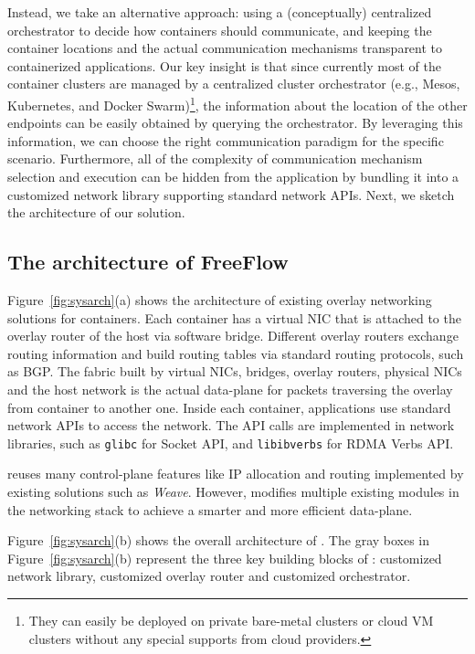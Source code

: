 Instead, we take an alternative approach: using a (conceptually) centralized
orchestrator to decide how containers should communicate, and keeping the
container locations and the actual communication mechanisms transparent to
containerized applications. Our key insight is that since currently most of the
container clusters are managed by a centralized cluster orchestrator (e.g., Mesos,
Kubernetes, and Docker Swarm)\footnote{They can easily be deployed on private
bare-metal clusters or cloud VM clusters without any special supports from cloud
providers.}, the information about the location of the other endpoints can be
easily obtained by querying the orchestrator. By leveraging this information, we
can choose the right communication paradigm for the specific scenario.
Furthermore, all of the complexity of communication mechanism selection and
execution can be hidden from the application by bundling it into a customized
network library supporting standard network APIs.  Next, we sketch the
architecture of our solution.

\subsection{The architecture of FreeFlow}

Figure~\ref{fig:sysarch}(a) shows the architecture of existing overlay
networking solutions for containers. Each container has a virtual NIC that is
attached to the overlay router of the host via software bridge. Different
overlay routers exchange routing information and build routing tables via
standard routing protocols, such as BGP. The fabric built by virtual NICs,
bridges, overlay routers, physical NICs and the host network is the
actual data-plane for packets traversing the overlay from container to another
one. Inside each container, applications use standard network APIs to access the
network. The API calls are implemented in network libraries, such as
\texttt{glibc} for Socket API, and \texttt{libibverbs} for RDMA Verbs API.

\sysname reuses many control-plane features like IP allocation and routing
implemented by existing solutions such as {\em Weave}.  However, \sysname
modifies multiple existing modules in the networking stack to achieve a smarter
and more efficient data-plane.

Figure~\ref{fig:sysarch}(b) shows the overall architecture of \sysname.  The
gray boxes in Figure~\ref{fig:sysarch}(b) represent the three key building
blocks of \sysname: customized network library, customized overlay router and
customized orchestrator.

